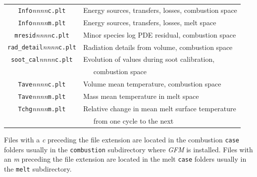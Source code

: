 \documentclass[12pt,twoside]{article}
\newcommand{\file}[1]{\texttt{#1}}
\newcommand{\cfile}[2]{\texttt{#1}\textit{nnnn}\texttt{#2}}
\newcommand{\prog}[1]{\textsl{#1}}
\numberwithin{equation}{section}
\begin{document}
\begin{table}[!ht]
\begin{tabular}{|c|l|}
			\cfile{Info} {c.plt}  & Energy sources, transfers, losses, combustion space \\
			\cfile{Info} {m.plt}  & Energy sources, transfers, losses, melt space \\
			\cfile{mresid}{c.plt}  & Minor species log PDE residual, combustion space \\
			\cfile{rad\_detail} {c.plt}  & Radiation details from volume, combustion space \\
			\cfile{soot\_cal} {c.plt}  & Evolution of values during soot calibration, \\
			                           & ~~~combustion space \\
			\cfile{Tave} {c.plt}  & Volume mean temperature, combustion space \\
			\cfile{Tave} {m.plt}  & Mass mean temperature in melt space \\
      \cfile{Tchg} {m.plt}  & Relative change in mean melt surface temperature \\
                            & ~~~from one cycle to the next \\			                      
			\hline
		\end{tabular}
\end{table}
Files with a \emph{c} preceding the file extension are located in the combustion \file{case} folders usually in the \file{combustion} subdirectory where \prog{GFM} is installed. Files with an \emph{m} preceding the file extension are located in the melt \file{case} folders usually in the \file{melt} subdirectory.

\end{document}
